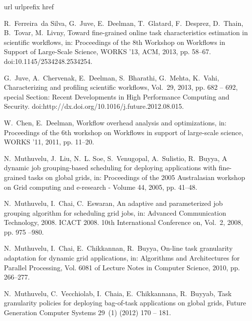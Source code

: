 \documentclass[final,5p,times,twocolumn]{elsarticle}
\begin{document}

\begin{thebibliography}{10}
\expandafter\ifx\csname url\endcsname\relax
  \def\url#1{\texttt{#1}}\fi
\expandafter\ifx\csname urlprefix\endcsname\relax\def\urlprefix{URL }\fi
\expandafter\ifx\csname href\endcsname\relax
  \def\href#1#2{#2} \def\path#1{#1}\fi

R.~Ferreira~da Silva, G.~Juve, E.~Deelman, T.~Glatard, F.~Desprez, D.~Thain,
  B.~Tovar, M.~Livny, Toward fine-grained online task characteristics
  estimation in scientific workflows, in: Proceedings of the 8th Workshop on
  Workflows in Support of Large-Scale Science, WORKS '13, ACM, 2013, pp.
  58--67.
\newblock \href {http://dx.doi.org/10.1145/2534248.2534254}
  {\path{doi:10.1145/2534248.2534254}}.

G.~Juve, A.~Chervenak, E.~Deelman, S.~Bharathi, G.~Mehta, K.~Vahi,
  Characterizing and profiling scientific workflows, Vol.~29, 2013, pp. 682 --
  692, special Section: Recent Developments in High Performance Computing and
  Security.
\newblock \href
  {http://dx.doi.org/http://dx.doi.org/10.1016/j.future.2012.08.015}
  {\path{doi:http://dx.doi.org/10.1016/j.future.2012.08.015}}.

W.~Chen, E.~Deelman, Workflow overhead analysis and optimizations, in:
  Proceedings of the 6th workshop on Workflows in support of large-scale
  science, WORKS '11, 2011, pp. 11--20.

N.~Muthuvelu, J.~Liu, N.~L. Soe, S.~Venugopal, A.~Sulistio, R.~Buyya, A dynamic
  job grouping-based scheduling for deploying applications with fine-grained
  tasks on global grids, in: Proceedings of the 2005 Australasian workshop on
  Grid computing and e-research - Volume 44, 2005, pp. 41--48.

N.~Muthuvelu, I.~Chai, C.~Eswaran, An adaptive and parameterized job grouping
  algorithm for scheduling grid jobs, in: Advanced Communication Technology,
  2008. ICACT 2008. 10th International Conference on, Vol.~2, 2008, pp. 975
  --980.

N.~Muthuvelu, I.~Chai, E.~Chikkannan, R.~Buyya, On-line task granularity
  adaptation for dynamic grid applications, in: Algorithms and Architectures
  for Parallel Processing, Vol. 6081 of Lecture Notes in Computer Science,
  2010, pp. 266--277.

N.~Muthuvelu, C.~Vecchiolab, I.~Chaia, E.~Chikkannana, R.~Buyyab, Task
  granularity policies for deploying bag-of-task applications on global grids,
  Future Generation Computer Systems 29~(1) (2012) 170 -- 181.


\end{thebibliography}
\end{document}
